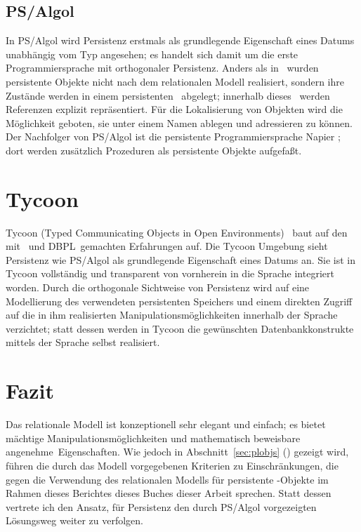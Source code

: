 \subsection{PS/Algol}
%
In PS/Algol \cite[]{bib:cl91}
\cite[]{bib:ni88} wird Persistenz erstmals als
grundlegende Eigenschaft eines Datums unabh\"{a}ngig vom Typ angesehen;
es handelt sich damit um die erste Programmiersprache mit orthogonaler
Persistenz. Anders als in \pascalr\ wurden persistente Objekte nicht
nach dem relationalen Modell realisiert, sondern ihre Zust\"{a}nde werden
in einem persistenten \heap\ abgelegt; innerhalb dieses
\heap[s]\ werden Referenzen explizit repr\"{a}sentiert. F\"{u}r die
Lokalisierung von Objekten wird die M\"{o}glichkeit geboten, sie unter
einem Namen ablegen und adressieren zu k\"{o}nnen. Der Nachfolger von
PS/Algol ist die persistente Programmiersprache Napier
\cite{bib:mo89b} \cite{bib:mo89a}; dort werden
zus\"{a}tzlich Prozeduren als persistente Objekte aufgefa\ss{}t.
%
%
\section{Tycoon}
%
Tycoon (Typed Communicating Objects in Open Environments)
\cite{bib:ma93} \cite{bib:ma92c}\ baut auf den mit \pascalr\
und \mbox{DBPL}\ gemachten Erfahrungen auf.  Die Tycoon Umgebung sieht
Persistenz wie PS/Algol als grundlegende Eigenschaft eines Datums an.
Sie ist in Tycoon vollst\"{a}ndig und transparent von vornherein in die
Sprache integriert worden. Durch die orthogonale Sichtweise von
Persistenz wird auf eine Modellierung des verwendeten persistenten
Speichers und einem direkten Zugriff auf die in ihm realisierten
Manipulationsm\"{o}glichkeiten innerhalb der Sprache verzichtet; statt
dessen werden in Tycoon die gew\"{u}nschten Datenbankkonstrukte mittels
der Sprache selbst realisiert.
%
\section{Fazit}
%
Das relationale Modell ist konzeptionell sehr elegant und einfach; es
bietet m\"{a}chtige Manipulationsm\"{o}glichkeiten und mathematisch
beweisbare \rglq{}angenehme\rgrq\ Eigenschaften. Wie jedoch in
Abschnitt~\ref{sec:plobjs} (\citepage{\pageref{sec:plobjs}}) gezeigt
wird, f\"{u}hren die durch das Modell vorgegebenen Kriterien zu
Einschr\"{a}nkungen, die gegen die Verwendung des relationalen Modells
f\"{u}r persistente \clos-Objekte im Rahmen \ifbericht dieses
Berichtes \else\ifbuch dieses Buches \else dieser Arbeit \fi\fi
sprechen. Statt dessen vertrete ich den Ansatz, f\"{u}r Persistenz den
durch PS/Algol vorgezeigten L\"{o}sungsweg weiter zu verfolgen.


